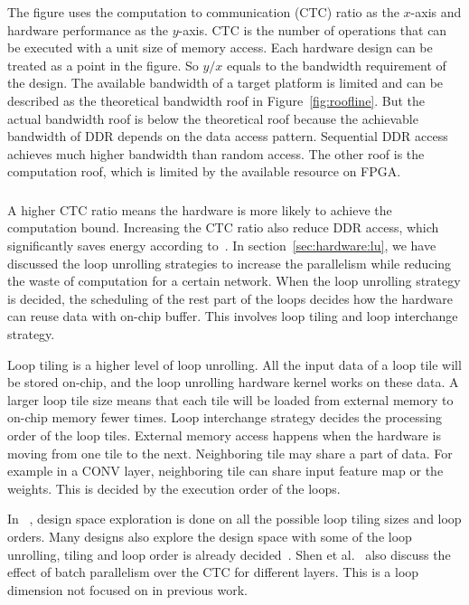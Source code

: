 The figure uses the computation to communication (CTC) ratio as the $x$-axis and hardware performance as the $y$-axis. CTC is the number of operations that can be executed with a unit size of memory access. Each hardware design can be treated as a point in the figure. So $y/x$ equals to the bandwidth requirement of the design. The available bandwidth of a target platform is limited and can be described as the theoretical bandwidth roof in Figure~\ref{fig:roofline}. But the actual bandwidth roof is below the theoretical roof because the achievable bandwidth of DDR depends on the data access pattern. Sequential DDR access achieves much higher bandwidth than random access. The other roof is the computation roof, which is limited by the available resource on FPGA.

\subsubsection{} A higher CTC ratio means the hardware is more likely to achieve the computation bound. Increasing the CTC ratio also reduce DDR access, which significantly saves energy according to~\cite{vlsi_energy}. In section~\ref{sec:hardware:lu}, we have discussed the loop unrolling strategies to increase the parallelism while reducing the waste of computation for a certain network. When the loop unrolling strategy is decided, the scheduling of the rest part of the loops decides how the hardware can reuse data with on-chip buffer. This involves loop tiling and loop interchange strategy.

Loop tiling is a higher level of loop unrolling. All the input data of a loop tile will be stored on-chip, and the loop unrolling hardware kernel works on these data. A larger loop tile size means that each tile will be loaded from external memory to on-chip memory fewer times. Loop interchange strategy decides the processing order of the loop tiles. External memory access happens when the hardware is moving from one tile to the next. Neighboring tile may share a part of data. For example in a CONV layer, neighboring tile can share input feature map or the weights. This is decided by the execution order of the loops. 

In ~\cite{zhang2015optimizing, ma2017optimizing}, design space exploration is done on all the possible loop tiling sizes and loop orders. Many designs also explore the design space with some of the loop unrolling, tiling and loop order is already decided~\cite{motamedi2016design, qiu2016going}. Shen et al.~\cite{shen2017escher} also discuss the effect of batch parallelism over the CTC for different layers. This is a loop dimension not focused on in previous work.

